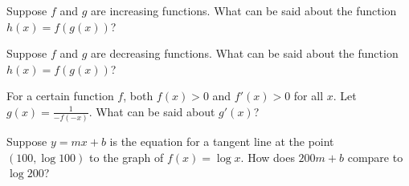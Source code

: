 \documentclass{ximera}
\newcommand{\recommendation}[1]{}
\begin{document}
\begin{problem}
  Suppose $f$ and $g$ are increasing functions.  What can be said about the function $h(x) = f(g(x))$?
  \begin{multipleChoice}
  \end{multipleChoice}
\end{problem}

\begin{problem}
  Suppose $f$ and $g$ are decreasing functions.  What can be said about the function $h(x) = f(g(x))$?
  \begin{multipleChoice}
  \end{multipleChoice}
\end{problem}

\begin{problem}
  For a certain function $f$, both $f(x) > 0$ and $f'(x) > 0$ for all $x$.  Let $g(x) = \frac{1}{-f(-x)}$.  What can be said about $g'(x)$?
  \begin{multipleChoice}
  \end{multipleChoice}
\end{problem}



\begin{problem}
  Suppose $y = mx + b$ is the equation for a tangent line at the point $(100,\log 100)$ to the graph of $f(x) = \log x$.  How does $200m + b$ compare to $\log 200$?
  \begin{multipleChoice}
  \end{multipleChoice}
\end{problem}
\end{document}
